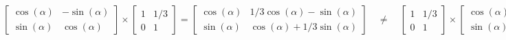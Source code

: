 \documentclass{article}
\begin{document}
\thispagestyle{empty}
$$
\begin{bmatrix}\cos(\alpha)&-\sin(\alpha)\\\sin(\alpha)&\cos(\alpha)\end{bmatrix}\times
\begin{bmatrix}1&1/3\\0&1\end{bmatrix}
=\begin{bmatrix}\cos(\alpha)&1/3\cos(\alpha)-\sin(\alpha)\\\sin(\alpha)&\cos(\alpha)+1/3\sin(\alpha)\end{bmatrix}
\quad
\neq
\quad
\begin{bmatrix}1&1/3\\0&1\end{bmatrix}\times
\begin{bmatrix}\cos(\alpha)&-\sin(\alpha)\\\sin(\alpha)&\cos(\alpha)\end{bmatrix}=
\begin{bmatrix}\cos(\alpha)+1/3\sin(\alpha)&1/3\cos(\alpha)-\sin(\alpha)\\\sin(\alpha)&\cos(\alpha)\end{bmatrix}
$$
\end{document}
